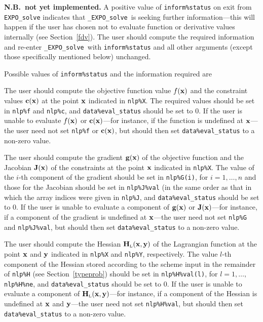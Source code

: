 \documentclass{galahad}
\newcommand{\packagename}{EXPO}
\newcommand{\fullpackagename}{\libraryname\_\packagename}
\newcommand{\solver}{{\tt \fullpackagename\_solve}}
\newcommand{\bmHL}{\bmH\sub{L}}
\begin{document}
{\bf N.B.\ not yet implemented.}
A positive value of {\tt inform\%status} on exit from
{\tt \packagename\_solve}
indicates that
\solver\ is seeking further information---this will happen
if the user has chosen not to evaluate function or
derivative values internally (see Section~\ref{fdv}).
The user should compute the required information and re-enter \solver\
with {\tt inform\%status} and all other arguments (except those specifically
mentioned below) unchanged.

Possible values of {\tt inform\%status} and the information required are
\begin{description}
 The user should compute the objective function value $f({\mathbf{x}})$ 
     and the constraint values ${\mathbf{c}}({\mathbf{x}})$ at the point ${\mathbf{x}}$ indicated 
     in {\tt nlp\%X}.
     The required values should be set in {\tt nlp\%f} and {\tt nlp\%c}, and
     {\tt data\%eval\_status} should be set to 0. If the user is
     unable to evaluate $f({\mathbf{x}})$ or ${\mathbf{c}}({\mathbf{x}})$---for instance, if the 
     function is undefined at ${\mathbf{x}}$---the user need not set {\tt nlp\%f}
     or ${\mathbf{c}}({\mathbf{x}})$, but
     should then set {\tt data\%eval\_status} to a non-zero value.

 The user should compute the gradient ${\mathbf{g}}({\mathbf{x}})$ of the 
     objective function and the Jacobian ${\mathbf{J}}({\mathbf{x}})$ of the constraints
     at the point ${\mathbf{x}}$ indicated in {\tt nlp\%X}.
     The value of the $i$-th component of the gradient should be set
     in {\tt nlp\%G(i)}, for $i = 1, \ldots, n$ and those for the
     Jacobian should be set in  {\tt nlp\%J\%val}
     (in the same order as that in which the array indices were given 
     in {\tt nlp\%J},  and {\tt data\%eval\_status} should be set to 0. 
     If the user is unable to evaluate a component of ${\mathbf{g}}({\mathbf{x}})$ or 
     ${\mathbf{J}}({\mathbf{x}})$---for  instance, if a component of the gradient is
     undefined at ${\mathbf{x}}$---the user need not set {\tt nlp\%G} and 
     {\tt nlp\%J\%val}, but  should then set {\tt data\%eval\_status} 
     to a non-zero value.

 The user should compute the Hessian $\bmHL(\bmx,\bmy)$
     of the Lagrangian function at the point ${\mathbf{x}}$ and ${\mathbf{y}}$
     indicated in {\tt nlp\%X} and {\tt nlp\%Y}, respectively.
     The value $l$-th component of the Hessian stored according to the
     scheme input in the remainder of {\tt nlp\%H} (see Section~\ref{typeprob})
     should be set in {\tt nlp\%H\%val(l)}, for $l = 1, \ldots,$ 
     {\tt nlp\%H\%ne}, and {\tt data\%eval\_status} should be set to 0. 
     If the user is  unable to evaluate a component of $\bmHL(\bmx,\bmy)$---for
     instance, if a component of the Hessian is
     undefined at ${\mathbf{x}}$ and ${\mathbf{y}}$---the user need not set
     {\tt nlp\%H\%val}, but should then set {\tt data\%eval\_status} 
     to a non-zero value.


\end{description}
\end{document}
